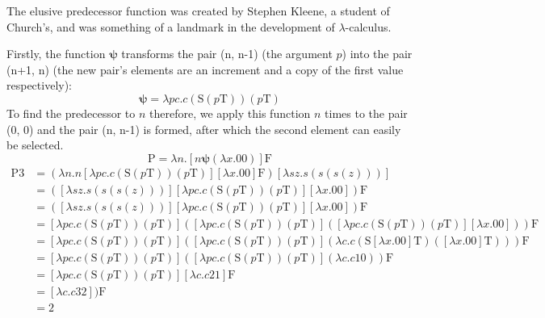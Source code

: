 \documentclass[Master.tex]{subfiles}
\begin{document}
The elusive predecessor function was created by Stephen Kleene, a student of Church's, and was something of a landmark in the development of $\lambda$-calculus.

Firstly, the function $\bm{\psi}$ transforms the pair (n, n-1) (the argument $p$) into the pair (n+1, n) (the new pair's elements are an increment and a copy of the first value respectively):
\cite{rojas2015lambdatutorial}
\begin{equation*}
\bm{\psi} = \lambda pc.c(\bm{\mathrm{S}}(p\bm{\mathrm{T}}))(p\bm{\mathrm{T}})
\end{equation*}
To find the predecessor to $n$ therefore, we apply this function $n$ times to the pair (0, 0) and the pair (n, n-1) is formed, after which the second element can easily be selected.
\cite{rojas2015lambdatutorial}
\begin{equation*}
\bm{\mathrm{P}} = \lambda n.[n \bm{\psi} (\lambda x.\bm{\mathrm{00}})] \bm{\mathrm{F}} 
\end{equation*}
\begin{equation*}
\begin{aligned}
\bm{\mathrm{P3}} &= (\lambda n.n [\lambda pc.c(\bm{\mathrm{S}}(p\bm{\mathrm{T}}))(p\bm{\mathrm{T}})] [\lambda x.\bm{\mathrm{00}}] \bm{\mathrm{F}}) [\lambda sz.s(s(s(z)))]\\
&= ([\lambda sz.s(s(s(z)))] [\lambda pc.c(\bm{\mathrm{S}}(p\bm{\mathrm{T}}))(p\bm{\mathrm{T}})] [\lambda x.\bm{\mathrm{00}}]) \bm{\mathrm{F}}\\
&= ([\lambda sz.s(s(s(z)))] [\lambda pc.c(\bm{\mathrm{S}}(p\bm{\mathrm{T}}))(p\bm{\mathrm{T}})] [\lambda x.\bm{\mathrm{00}}]) \bm{\mathrm{F}}\\
&= [\lambda pc.c(\bm{\mathrm{S}}(p\bm{\mathrm{T}}))(p\bm{\mathrm{T}})]([\lambda pc.c(\bm{\mathrm{S}}(p\bm{\mathrm{T}}))(p\bm{\mathrm{T}})]([\lambda pc.c(\bm{\mathrm{S}}(p\bm{\mathrm{T}}))(p\bm{\mathrm{T}})][\lambda x.\bm{\mathrm{00}}]))\bm{\mathrm{F}}\\
&= [\lambda pc.c(\bm{\mathrm{S}}(p\bm{\mathrm{T}}))(p\bm{\mathrm{T}})]([\lambda pc.c(\bm{\mathrm{S}}(p\bm{\mathrm{T}}))(p\bm{\mathrm{T}})](\lambda c.c(\bm{\mathrm{S}}[\lambda x.\bm{\mathrm{00}}]\bm{\mathrm{T}})([\lambda x.\bm{\mathrm{00}}]\bm{\mathrm{T}})))\bm{\mathrm{F}}\\
&= [\lambda pc.c(\bm{\mathrm{S}}(p\bm{\mathrm{T}}))(p\bm{\mathrm{T}})]([\lambda pc.c(\bm{\mathrm{S}}(p\bm{\mathrm{T}}))(p\bm{\mathrm{T}})](\lambda c.c\bm{\mathrm{10}}))\bm{\mathrm{F}}\\
&= [\lambda pc.c(\bm{\mathrm{S}}(p\bm{\mathrm{T}}))(p\bm{\mathrm{T}})][\lambda c.c\bm{\mathrm{21}}]\bm{\mathrm{F}}\\
&= [\lambda c.c\bm{\mathrm{32}} ])\bm{\mathrm{F}}\\
&= \bm{\mathrm{2}}
\end{aligned}
\end{equation*}
\end{document}
